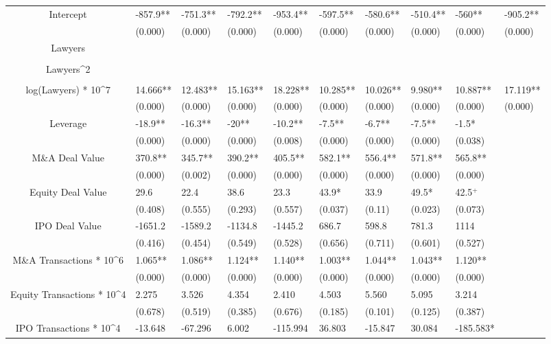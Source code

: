 \documentclass{article}
\begin{document}
\begin{table}[H]
\begin{tabular}{|clllllllll|}
Intercept & -857.9** & -751.3** & -792.2** & -953.4** & -597.5** & -580.6** & -510.4** & -560** & -905.2** \\
   & (0.000) & (0.000) & (0.000) & (0.000) & (0.000) & (0.000) & (0.000) & (0.000) & (0.000) \\
  Lawyers &  &  &  &  &  &  &  &  &  \\
   &  &  &  &  &  &  &  &  &  \\
  Lawyers^2 &  &  &  &  &  &  &  &  &  \\
   &  &  &  &  &  &  &  &  &  \\
  log(Lawyers) * 10^7 & 14.666** & 12.483** & 15.163** & 18.228** & 10.285** & 10.026** & 9.980** & 10.887** & 17.119** \\
   & (0.000) & (0.000) & (0.000) & (0.000) & (0.000) & (0.000) & (0.000) & (0.000) & (0.000) \\
  Leverage & -18.9** & -16.3** & -20** & -10.2** & -7.5** & -6.7** & -7.5** & -1.5* &  \\
   & (0.000) & (0.000) & (0.000) & (0.008) & (0.000) & (0.000) & (0.000) & (0.038) &  \\
  M\&A Deal Value & 370.8** & 345.7** & 390.2** & 405.5** & 582.1** & 556.4** & 571.8** & 565.8** &  \\
   & (0.000) & (0.002) & (0.000) & (0.000) & (0.000) & (0.000) & (0.000) & (0.000) &  \\
  Equity Deal Value & 29.6 & 22.4 & 38.6 & 23.3 & 43.9* & 33.9 & 49.5* & 42.5$^{+}$ &  \\
   & (0.408) & (0.555) & (0.293) & (0.557) & (0.037) & (0.11) & (0.023) & (0.073) &  \\
  IPO Deal Value & -1651.2 & -1589.2 & -1134.8 & -1445.2 & 686.7 & 598.8 & 781.3 & 1114 &  \\
   & (0.416) & (0.454) & (0.549) & (0.528) & (0.656) & (0.711) & (0.601) & (0.527) &  \\
  M\&A Transactions * 10^6 & 1.065** & 1.086** & 1.124** & 1.140** & 1.003** & 1.044** & 1.043** & 1.120** &  \\
   & (0.000) & (0.000) & (0.000) & (0.000) & (0.000) & (0.000) & (0.000) & (0.000) &  \\
  Equity Transactions * 10^4 & 2.275 & 3.526 & 4.354 & 2.410 & 4.503 & 5.560 & 5.095 & 3.214 &  \\
   & (0.678) & (0.519) & (0.385) & (0.676) & (0.185) & (0.101) & (0.125) & (0.387) &  \\
  IPO Transactions * 10^4 & -13.648 & -67.296 & 6.002 & -115.994 & 36.803 & -15.847 & 30.084 & -185.583* &  \\

\end{tabular}
\end{table}
\end{document}
